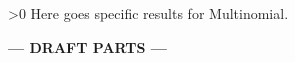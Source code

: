 \ifnum\printdraft>0
	Here goes specific results for Multinomial.
\else
\begin{center}
  	\textbf{--- DRAFT PARTS ---}
\end{center}
\fi

